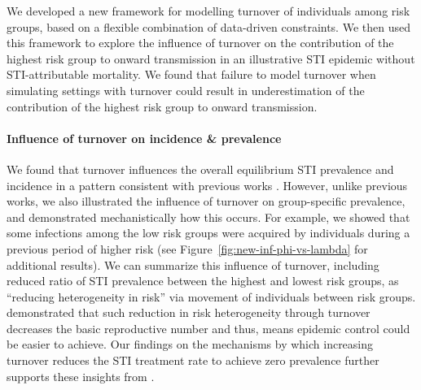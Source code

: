 We developed a new framework for modelling turnover of individuals among risk groups,
based on a flexible combination of data-driven constraints.
We then used this framework to explore the influence of turnover on
the contribution of the highest risk group to onward transmission in an
illustrative STI epidemic without STI-attributable mortality.
We found that failure to model turnover when simulating settings with turnover
could result in underestimation of
the contribution of the highest risk group to onward transmission.
\paragraph{Influence of turnover on incidence \& prevalence}
We found that turnover influences the overall equilibrium STI prevalence and incidence
in a pattern consistent with previous works \citep{Stigum1994,Zhang2012,Henry2015}.
However, unlike previous works, we also illustrated the influence of turnover on
group-specific prevalence, and demonstrated mechanistically how this occurs.
For example, we showed that some infections among the low risk groups
were acquired by individuals during a previous period of higher risk
(see Figure~\ref{fig:new-inf-phi-vs-lambda} for additional results).
We can summarize this influence of turnover,
including reduced ratio of STI prevalence between the highest and lowest risk groups,
as ``reducing heterogeneity in risk'' via movement of individuals between risk groups.
\citet{Henry2015} demonstrated that
such reduction in risk heterogeneity through turnover
decreases the basic reproductive number and thus,
means epidemic control could be easier to achieve.
Our findings on the mechanisms by which increasing turnover
reduces the STI treatment rate to achieve zero prevalence
further supports these insights from \citet{Henry2015}.
